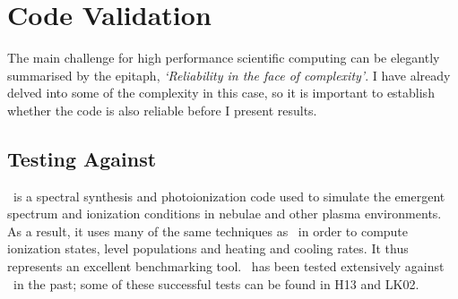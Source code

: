 




\section{Code Validation}
\label{sec:code_validation}

The main challenge for high performance scientific computing can be 
elegantly summarised by the \cite{ferland2002} epitaph, {\sl `Reliability in the face 
of complexity'}. I have already delved into some of the complexity in this case,
so it is important to establish whether the code is also reliable before I present
results. 

\subsection{Testing Against \cld}

\cld\ is a spectral synthesis and photoionization code used to simulate
the emergent spectrum and ionization conditions in nebulae and other plasma
environments. As a result, it uses many of the same techniques as \py\
in order to compute ionization states, level populations and heating and cooling
rates. It thus represents an excellent benchmarking tool. \py\ has been tested extensively
against \cld\ in the past; some of these successful
tests can be found in H13 and LK02.

